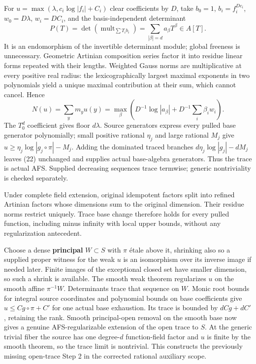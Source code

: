 \documentclass[
  10pt,
]{article}
\begin{document}
For \(u=\max(\lambda,c_i\log|f_i|+C_i)\) clear coefficients by \(D\),
take \(b_0=1\), \(b_i=f_i^{Dc_i}\), \(w_0=D\lambda\), \(w_i=DC_i\), and
the basis-independent determinant
\[P(T)=\det(\operatorname{mult}_{\sum T_i b_i})=\sum_{|\beta|=d}a_\beta T^\beta\in A[T].\]
It is an endomorphism of the invertible determinant module; global
freeness is unnecessary. Geometric Artinian composition series factor it
into residue linear forms repeated with their lengths. Weighted Gauss
norms are multiplicative at every positive real radius: the
lexicographically largest maximal exponents in two polynomials yield a
unique maximal contribution at their sum, which cannot cancel. Hence
\[N(u)=\sum_y m_yu(y)=\max_\beta
 \left(D^{-1}\log|a_\beta|+D^{-1}\sum_i\beta_iw_i\right). \tag{22}\] The
\(T_0^d\) coefficient gives floor \(d\lambda\). Source generators
express every pulled base generator polynomially; small positive
rational \(\eta_j\) and large rational \(M_j\) give
\(u\ge\eta_j\log|g_j\circ\pi|-M_j\). Adding the dominated traced
branches \(d\eta_j\log|g_j|-dM_j\) leaves (22) unchanged and supplies
actual base-algebra generators. Thus the trace is actual AFS. Supplied
decreasing sequences trace termwise; generic nontriviality is checked
separately.

Under complete field extension, original idempotent factors split into
refined Artinian factors whose dimensions sum to the original dimension.
Their residue norms restrict uniquely. Trace base change therefore holds
for every pulled function, including minus infinity with local upper
bounds, without any regularization antecedent.

Choose a dense \textbf{principal} \(W\subset S\) with \(\pi\) étale
above it, shrinking also so a supplied proper witness for the weak \(u\)
is an isomorphism over its inverse image if needed later. Finite images
of the exceptional closed set have smaller dimension, so such a shrink
is available. The smooth weak theorem regularizes \(u\) on the smooth
affine \(\pi^{-1}W\). Determinants trace that sequence on \(W\). Monic
root bounds for integral source coordinates and polynomial bounds on
base coefficients give \(u\le Cg\circ\pi+C'\) for one actual base
exhaustion. Its trace is bounded by \(dCg+dC'\), retaining the rank.
Smooth principal-open removal on the smooth base now gives a genuine
AFS-regularizable extension of the open trace to \(S\). At the generic
trivial fiber the source has one degree-\(d\) function-field factor and
\(u\) is finite by the smooth theorem, so the trace limit is nontrivial.
This constructs the previously missing open-trace Step 2 in the
corrected rational auxiliary scope.
\end{document}
